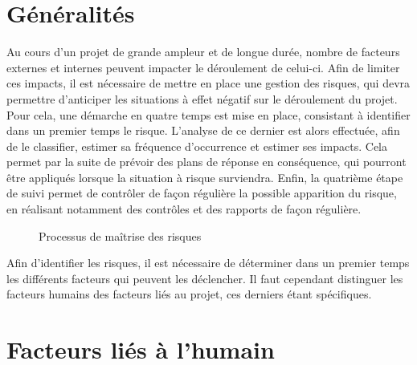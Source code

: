 \section{Généralités}

Au cours d’un projet de grande ampleur et de longue durée, nombre de facteurs externes et internes peuvent impacter le déroulement de celui-ci. Afin de limiter ces impacts, il est nécessaire de mettre en place une gestion des risques, qui devra permettre d’anticiper les situations à effet négatif sur le déroulement du projet. Pour cela, une démarche en quatre temps est mise en place, consistant à identifier dans un premier temps le risque. L’analyse de ce dernier est alors effectuée, afin de le classifier, estimer sa fréquence d’occurrence et estimer ses impacts. Cela permet par la suite de prévoir des plans de réponse en conséquence, qui pourront être appliqués lorsque la situation à risque surviendra. Enfin, la quatrième étape de suivi permet de contrôler de façon régulière la possible apparition du risque, en réalisant notamment des contrôles et des rapports de façon régulière. \\

\begin{figure}[H]
    \label{fig-risque}
    \noindent{}
    \caption{Processus de maîtrise des risques}
\end{figure}

Afin d’identifier les risques, il est nécessaire de déterminer dans un premier temps les différents facteurs qui peuvent les déclencher. Il faut cependant distinguer les facteurs humains des facteurs liés au projet, ces derniers étant spécifiques. \\

\section{Facteurs liés à l'humain}


